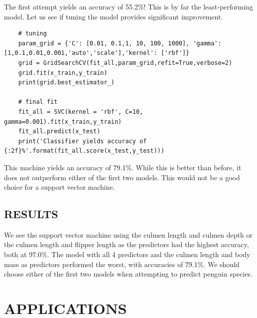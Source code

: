 \documentclass[12pt]{article}
\begin{document}
The first attempt yields an accuracy of 55.2\%! This is by far the least-performing model. Let us see if tuning the model provides significant improvement.

\begin{verbatim}
    # tuning
    param_grid = {'C': [0.01, 0.1,1, 10, 100, 1000], 'gamma': [1,0.1,0.01,0.001,'auto','scale'],'kernel': ['rbf']}
    grid = GridSearchCV(fit_all,param_grid,refit=True,verbose=2)
    grid.fit(x_train,y_train)
    print(grid.best_estimator_)

    # final fit
    fit_all = SVC(kernel = 'rbf', C=10, gamma=0.001).fit(x_train,y_train)
    fit_all.predict(x_test)
    print('Classifier yields accuracy of {:2f}%'.format(fit_all.score(x_test,y_test)))
\end{verbatim}

This machine yields an accuracy of 79.1\%. While this is better than before, it does not outperform either of the first two models. This would not be a good choice for a support vector machine.

\subsection{RESULTS}

We see the support vector machine using the culmen length and culmen depth or the culmen length and flipper length as the predictors had the highest accuracy, both at $97.0\%$. The model with all 4 predictors and the culmen length and body mass as predictors performed the worst, with accuracies of 79.1\%. We should choose either of the first two models when attempting to predict penguin species.

\section{APPLICATIONS}
\end{document}
